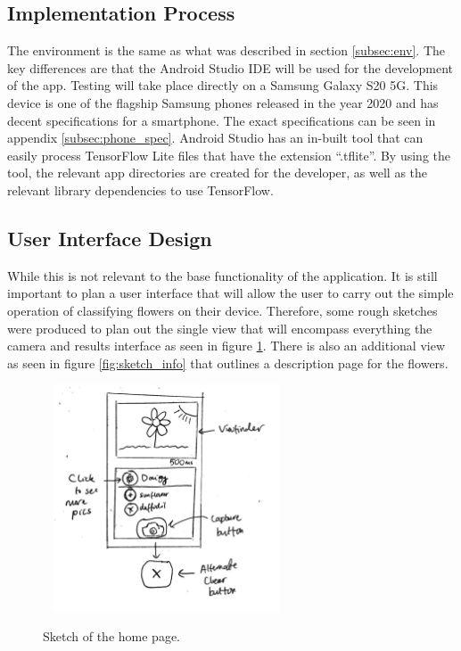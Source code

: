 \documentclass[12pt,a4paper]{report}
\begin{document}
\subsection{Implementation Process}

The environment is the same as what was described in section \ref{subsec:env}. The key differences are that the Android 
Studio IDE will be used for the development of the app. Testing will take place directly on a Samsung Galaxy S20 5G. 
This device is one of the flagship Samsung phones released in the year 2020 and has decent specifications for a 
smartphone. The exact specifications can be seen in appendix \ref{subsec:phone_spec}. Android Studio has an in-built 
tool that can easily process TensorFlow Lite files that have the extension “.tflite”. By using the tool, the relevant 
app directories are created for the developer, as well as the relevant library dependencies to use TensorFlow.

\subsection{User Interface Design}

While this is not relevant to the base functionality of the application. It is still important to plan a user interface 
that will allow the user to carry out the simple operation of classifying flowers on their device. Therefore, some rough
sketches were produced to plan out the single view that will encompass everything the camera and results interface as 
seen in figure \ref{fig:sketch_main}. There is also an additional view as seen in figure \ref{fig:sketch_info} that outlines a description page for the 
flowers.

\begin{figure}[h]\
    \centering
    \includegraphics[width=0.6\textwidth]{Main_Sketch.jpg}
    \caption{Sketch of the home page.}
    \label{fig:sketch_main}
\end{figure}
\end{document}
